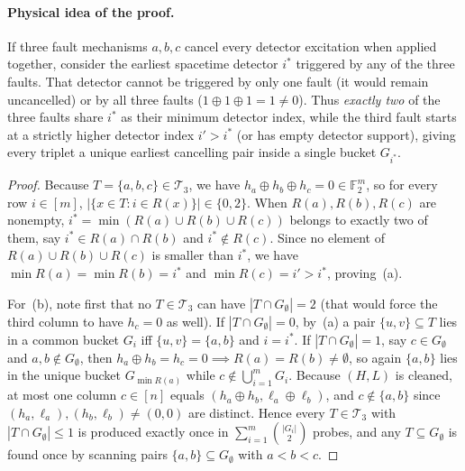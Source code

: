 \documentclass[12pt]{article}
\theoremstyle{definition}
\newcommand{\Ftwo}{\mathbb{F}_2}
\newcommand{\Tc}{\mathcal{T}_3}
\begin{document}
\paragraph{Physical idea of the proof.}
If three fault mechanisms $a, b, c$ cancel every detector excitation when applied together, consider the earliest
spacetime detector $i^*$ triggered by any of the three faults. That detector cannot be triggered by only one fault
(it would remain uncancelled) or by all three faults ($1 \oplus 1 \oplus 1 = 1 \neq 0$). Thus \emph{exactly two} of
the three faults share $i^*$ as their minimum detector index, while the third fault starts at a strictly higher
detector index $i' > i^*$ (or has empty detector support), giving every triplet a unique earliest cancelling pair
inside a single bucket $G_{i^*}$.

\begin{proof}
Because $T = \{a, b, c\} \in \Tc$, we have $h_a \oplus h_b \oplus h_c = 0 \in \Ftwo^m$, so for every row $i \in
[m]$, $|\{x \in T : i \in R(x)\}| \in \{0, 2\}$. When $R(a), R(b), R(c)$ are nonempty, $i^* = \min(R(a) \cup R(b)
\cup R(c))$ belongs to exactly two of them, say $i^* \in R(a) \cap R(b)$ and $i^* \notin R(c)$. Since no element of
$R(a) \cup R(b) \cup R(c)$ is smaller than $i^*$, we have $\min R(a) = \min R(b) = i^*$ and $\min R(c) = i' > i^*$,
proving~(a).

For~(b), note first that no $T \in \Tc$ can have $|T \cap G_\emptyset| = 2$ (that would force the third column to
have $h_c = 0$ as well). If $|T \cap G_\emptyset| = 0$, by~(a) a pair $\{u, v\} \subseteq T$ lies in a common
bucket $G_i$ iff $\{u, v\} = \{a, b\}$ and $i = i^*$. If $|T \cap G_\emptyset| = 1$, say $c \in G_\emptyset$ and
$a, b \notin G_\emptyset$, then $h_a \oplus h_b = h_c = 0 \implies R(a) = R(b) \neq \emptyset$, so again $\{a, b\}$
lies in the unique bucket $G_{\min R(a)}$ while $c \notin \bigcup_{i=1}^m G_i$. Because $(H, L)$ is cleaned, at most
one column $c \in [n]$ equals $(h_a \oplus h_b, \ell_a \oplus \ell_b)$, and $c \notin \{a, b\}$ since $(h_a,
\ell_a), (h_b, \ell_b) \neq (0, 0)$ are distinct. Hence every $T \in \Tc$ with $|T \cap G_\emptyset| \le 1$ is
produced exactly once in $\sum_{i=1}^m \binom{|G_i|}{2}$ probes, and any $T \subseteq G_\emptyset$ is found once by
scanning pairs $\{a, b\} \subseteq G_\emptyset$ with $a < b < c$.
\end{proof}
\end{document}
